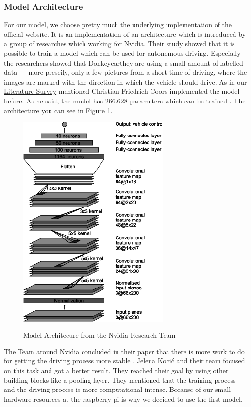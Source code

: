 \documentclass[journal]{IEEEtran}
\begin{document}
\subsubsection{Model Architecture}
\label{subsec:ModelArchitecture}
For our model, we choose pretty much the underlying implementation of the official  website. It is an implementation of an architecture which is introduced by a group of researches which working for Nvidia. Their study showed that it is possible to train a model which can be used for autonomous driving. Especially the researchers showed that Donkeycarthey are using a small amount of labelled data — more preseily,   only a few pictures from a short time of driving, where the images are marked with the direction in which the vehicle should drive\cite{LearningForSelf-DrivingCars}. As in our \hyperref[sec:LiteratureSurvey]{Literature Survey} mentioned Christian Friedrich Coors implemented the model before.  As he said, the model has 266.628 parameters which can be trained \cite{Coors}. The architecture you can see in Figure \ref{fig:Archi}.
\begin{figure}
  \begin{center}
  \includegraphics[width=3in]{photo/CNNArchitecture.png}\\
  \caption{Model Architecure from the Nvidia Research Team \cite{LearningForSelf-DrivingCars}}
  \label{fig:Archi}
  \end{center}
\end{figure}
The Team around Nvidia concluded in their paper that there is more work to do for getting the driving process more stable \cite{LearningForSelf-DrivingCars}. Jelena Kocić and their team focused on this task and got a better result. They reached their goal by using other building blocks like a pooling layer. They mentioned that the training process and the driving process is more computational intense. Because of our small hardware resources at the raspberry pi is why we decided to use the first model. \cite{AutomotivePlatformsAutonomousDriving}
\end{document}
